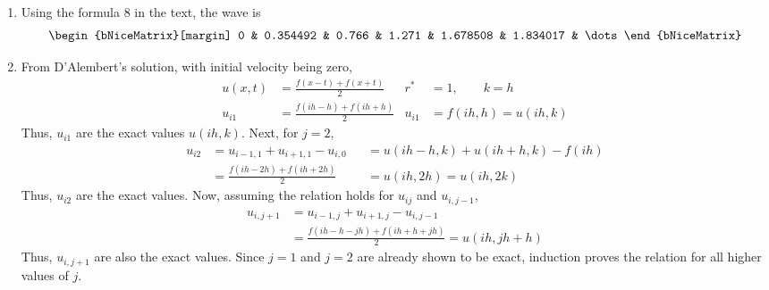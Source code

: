 \begin{enumerate}
    \item Using the formula $ 8 $ in the text, the wave is
          \begin{align}
              \begin{bNiceMatrix}[margin]
                  0 & 0.354492 & 0.766 & 1.271 & 1.678508 & 1.834017 & \dots
              \end{bNiceMatrix}
          \end{align}

    \item From D'Alembert's solution, with initial velocity being zero,
          \begin{align}
              u(x, t) & = \frac{f(x-t) + f(x+t)}{2}   &
              r^*     & = 1, \qquad k = h               \\
              u_{i1}  & = \frac{f(ih-h) + f(ih+h)}{2} &
              u_{i1}  & = f(ih,h) = u(ih,k)
          \end{align}
          Thus, $ u_{i1} $ are the exact values $ u(ih,k) $. Next, for $ j=2 $,
          \begin{align}
              u_{i2} & = u_{i-1,1} + u_{i+1,1} - u_{i,0} &
                     & = u(ih-h,k) + u(ih+h,k) - f(ih)     \\
                     & = \frac{f(ih-2h) + f(ih+2h)}{2}   &
                     & = u(ih, 2h) = u(ih,2k)
          \end{align}
          Thus, $ u_{i2} $ are the exact values. Now, assuming the relation holds for
          $ u_{ij} $ and $ u_{i,j-1} $,
          \begin{align}
              u_{i,j+1} & = u_{i-1,j} + u_{i+1,j} - u_{i,j-1}              \\
                        & = \frac{f(ih-h-jh) + f(ih+h+jh)}{2} = u(ih,jh+h)
          \end{align}
          Thus, $ u_{i,j+1} $ are also the exact values. Since $ j=1 $ and $ j=2 $ are
          already shown to be exact, induction proves the relation for all higher
          values of $ j $.
\end{enumerate}